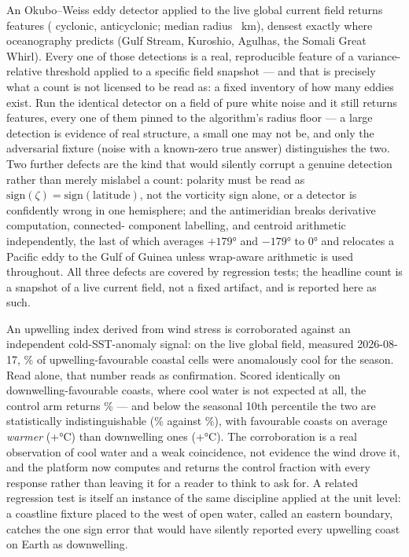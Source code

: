  An Okubo--Weiss eddy
detector applied to the live global current field returns \EddyCount{}
features (\EddyCyclonic{} cyclonic, \EddyAnticyclonic{} anticyclonic; median
radius \EddyRadius{}~km), densest exactly where oceanography predicts
(Gulf Stream, Kuroshio, Agulhas, the Somali Great Whirl). Every one of those
detections is a real, reproducible feature of a variance-relative threshold
applied to a specific field snapshot --- and that is precisely what a count
is not licensed to be read as: a fixed inventory of how many eddies exist.
Run the identical detector on a field of pure white noise and it still
returns features, every one of them pinned to the algorithm's radius floor
--- a large detection is evidence of real structure, a small one may not be,
and only the adversarial fixture (noise with a known-zero true answer)
distinguishes the two. Two further defects are the kind that would silently
corrupt a genuine detection rather than merely mislabel a count: polarity
must be read as $\mathrm{sign}(\zeta) = \mathrm{sign}(\mathrm{latitude})$,
not the vorticity sign alone, or a detector is confidently wrong in one
hemisphere; and the antimeridian breaks derivative computation, connected-
component labelling, and centroid arithmetic independently, the last of
which averages $+179\si{\degree}$ and $-179\si{\degree}$ to $0\si{\degree}$
and relocates a Pacific eddy to the Gulf of Guinea unless wrap-aware
arithmetic is used throughout. All three defects are covered by regression
tests; the headline count is a snapshot of a live current field, not a
fixed artifact, and is reported here as such.

 An upwelling index derived from wind stress is corroborated
against an independent cold-SST-anomaly signal: on the live global field,
measured 2026-08-17, \UpwellFavor{}\% of upwelling-favourable coastal cells
were anomalously cool for the season. Read alone, that number reads as
confirmation. Scored identically on downwelling-favourable coasts, where
cool water is not expected at all, the control arm returns
\UpwellControl{}\% --- and below the seasonal 10th percentile the two are
statistically indistinguishable (\UpwellStrongFavor{}\% against
\UpwellStrongControl{}\%), with favourable coasts on average \emph{warmer}
(+\UpwellAnomFavor{}\si{\celsius}) than downwelling ones
(+\UpwellAnomControl{}\si{\celsius}). The corroboration is a real
observation of cool water and a weak coincidence, not evidence the wind
drove it, and the platform now computes and returns the control fraction
with every response rather than leaving it for a reader to think to ask
for. A related regression test is itself an instance of the same discipline
applied at the unit level: a coastline fixture placed to the west of open
water, called an eastern boundary, catches the one sign error that would
have silently reported every upwelling coast on Earth as downwelling.

